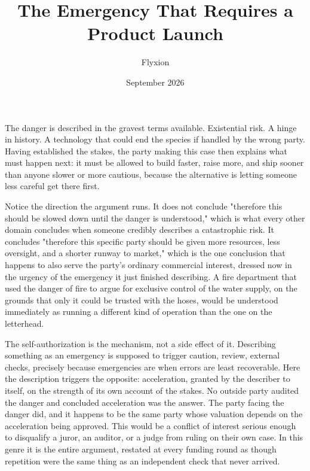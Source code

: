\documentclass[11pt]{article}
\title{The Emergency That Requires a Product Launch}
\author{Flyxion}
\date{September 2026}
\begin{document}
\maketitle

The danger is described in the gravest terms available. Existential risk. A hinge in history. A technology that could end the species if handled by the wrong party. Having established the stakes, the party making this case then explains what must happen next: it must be allowed to build faster, raise more, and ship sooner than anyone slower or more cautious, because the alternative is letting someone less careful get there first.

Notice the direction the argument runs. It does not conclude "therefore this should be slowed down until the danger is understood," which is what every other domain concludes when someone credibly describes a catastrophic risk. It concludes "therefore this specific party should be given more resources, less oversight, and a shorter runway to market," which is the one conclusion that happens to also serve the party's ordinary commercial interest, dressed now in the urgency of the emergency it just finished describing. A fire department that used the danger of fire to argue for exclusive control of the water supply, on the grounds that only it could be trusted with the hoses, would be understood immediately as running a different kind of operation than the one on the letterhead.

The self-authorization is the mechanism, not a side effect of it. Describing something as an emergency is supposed to trigger caution, review, external checks, precisely because emergencies are when errors are least recoverable. Here the description triggers the opposite: acceleration, granted by the describer to itself, on the strength of its own account of the stakes. No outside party audited the danger and concluded acceleration was the answer. The party facing the danger did, and it happens to be the same party whose valuation depends on the acceleration being approved. This would be a conflict of interest serious enough to disqualify a juror, an auditor, or a judge from ruling on their own case. In this genre it is the entire argument, restated at every funding round as though repetition were the same thing as an independent check that never arrived.
\end{document}
